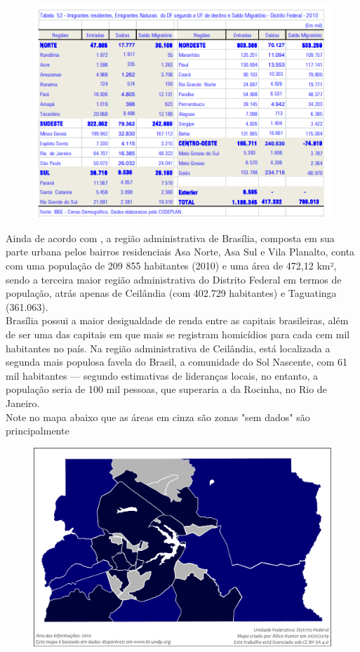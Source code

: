 \begin{figure}
    \centering
    \includegraphics{fig/imigrantes-2010}
    \caption{}
    \label{fig:imigrantes-2010}
\end{figure}


Ainda de acordo com , a região administrativa de Brasília, composta em sua parte urbana pelos bairros residenciais Asa Norte, Asa Sul e Vila Planalto, conta com uma população de 209 855 habitantes (2010) e uma área de 472,12 km², sendo a terceira maior região administrativa do Distrito Federal em termos de população, atrás apenas de Ceilândia (com 402.729 habitantes) e Taguatinga (361.063).\\

Brasília possui a maior desigualdade de renda entre as capitais brasileiras, além de ser uma das capitais em que mais se registram homicídios para cada cem mil habitantes no país. Na região administrativa de Ceilândia, está localizada a segunda mais populosa favela do Brasil, a comunidade do Sol Nascente, com 61 mil habitantes — segundo estimativas de lideranças locais, no entanto, a população seria de 100 mil pessoas, que superaria a da Rocinha, no Rio de Janeiro.\\

Note no mapa abaixo que as áreas em cinza são zonas "sem dados" são principalmente
\begin{figure}[H!]
    \centering
    \includegraphics[width=0.8\linewidth]{2-caps/cap02/Mapa_do_IDH_do_Distrito_Federal_(2010)}
    \caption{}
    \label{fig:mapadoidhdodistritofederal2010}
\end{figure}


